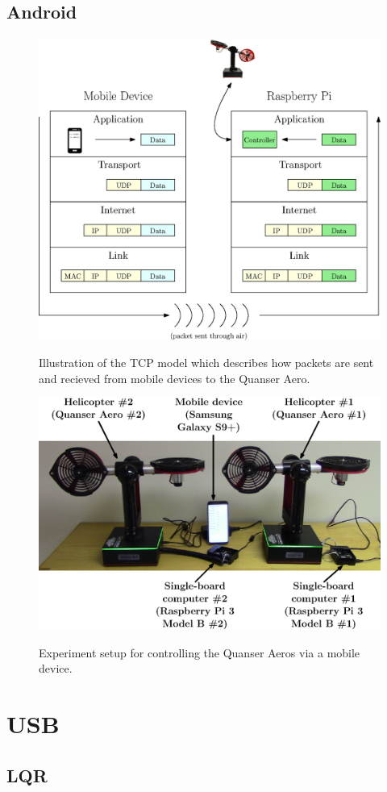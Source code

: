 \subsection{Android}
\begin{figure}[!htbp]
    \centering
    \includegraphics[width=.46\textwidth,keepaspectratio=true]{figs/ipe/TCPModel.eps}
    \label{fig:TCPModel}
    \caption{Illustration of the TCP model which describes how packets are sent and recieved from mobile devices to the Quanser Aero.}
\end{figure}

\begin{figure}[!htbp]
    \centering
    \includegraphics[width=.5\textwidth,keepaspectratio=true]{figs/ipe/Setup.eps}
    \label{fig:Setup}
    \caption{Experiment setup for controlling the Quanser Aeros via a mobile device.}
\end{figure}

\section{USB}
\subsection{LQR}

